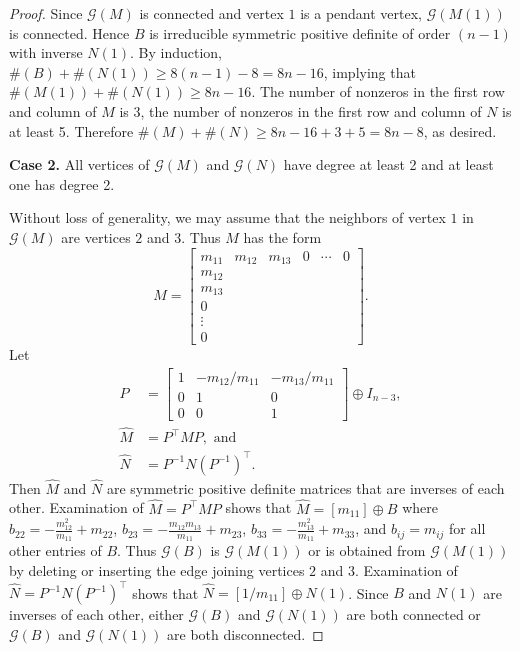 \documentclass[12pt]{article}
\theoremstyle{definition}
\theoremstyle{definition}
\theoremstyle{definition}
\numberwithin{figure}{section}
\numberwithin{equation}{section}
\newcommand{\G}{\mathcal{G}}
\newcommand{\trans}{^{\top}}
\begin{document}
\begin{proof}
Since $\G(M)$ is connected and vertex $1$ is a pendant vertex, $\G(M(1))$ is connected.
Hence $B$ is irreducible symmetric positive definite of order $(n-1)$ with inverse $N(1)$.
By induction, $\#(B) + \#(N(1))\geq 8(n-1)-8=8n-16$, implying that $\#(M(1))+ \#(N(1)) \geq 8n-16$.
The number of nonzeros in the first row and column of $M$ is 3, the number of nonzeros in the first row and column of $N$ is at least 5.
Therefore $\#(M)+ \#(N)\geq 8n-16 + 3 +5= 8n-8$,
as desired.


\bigskip\noindent 
{\bf Case 2.} All vertices of $\G(M)$ and $\G(N)$ have degree at least 2 and at least one has degree 2. 

Without loss of generality, we may assume that the neighbors of vertex $1$
in $\G(M)$ are vertices $2$ and $3$.  Thus $M$ has the form 
\[
M= \begin{bmatrix}
    m_{11} & m_{12} & m_{13} & 0 & \cdots & 0 \\
    m_{12}\\
    m_{13}
    \\
    0 \\
    \vdots\\
    0
\end{bmatrix}.
\]
Let 
\begin{align*}
P&= \begin{bmatrix}
    1 & -m_{12}/m_{11} & -m_{13}/m_{11}\\
    0 & 1 & 0 \\
    0 & 0 & 1
\end{bmatrix} \oplus I_{n-3},\\
\widehat{M}&= P\trans M P, \mbox{ and }\\
\widehat{N}&= P^{-1} N(P^{-1})\trans.
\end{align*}
Then $\widehat{M}$ and $\widehat{N}$ are symmetric positive definite matrices that are inverses of each other. Examination of $\widehat{M}=P\trans MP$ shows that  $\widehat{M}= [m_{11}] \oplus B$  where $b_{22}=-\frac{m_{12}^2}{m_{11}} + m_{22}$, $b_{23}=-\frac{m_{12}m_{13}}{m_{11}} + m_{23}$, $b_{33}=-\frac{m_{13}^2}{m_{11}} + m_{33}$, and $b_{ij}=m_{ij}$ for all other entries of $B$.
 Thus $\G(B)$ is  $\G(M(1))$ or is obtained from $\G(M(1))$ 
by deleting  or inserting  the edge joining vertices $2$ and $3$. Examination of $\widehat{N}=P^{-1} N (P^{-1})\trans$ shows that $\widehat{N}=
[1/m_{11}] \oplus N(1)$.  Since $B$ and $N(1)$ are inverses of each other, either   $\G(B)$ and $\G(N(1))$ are both connected or $\G(B)$ and $\G(N(1))$ are both disconnected.   


\end{proof}
\end{document}
